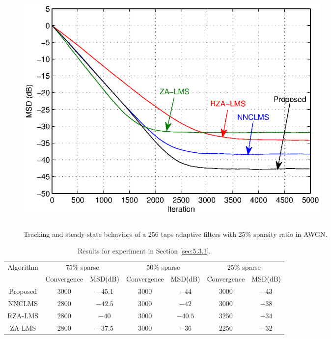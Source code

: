 \begin{figure}[!htb]
\begin{center}
\vspace{1cm}
\includegraphics[width=16cm, height=12cm]{Figures/Chapter5/fig8.eps}\\
\end{center}
\vspace{-1cm}
\caption{Tracking and steady-state behaviors of a 256 taps adaptive filters with 25\% sparsity ratio in AWGN.}
\label{fig10}
\vspace{1.5cm}
\end{figure}

 \begin{table}[!htb]
\centering
\caption{Results for experiment in Section \ref{sec:5.3.1}.}
\vspace{0.5cm}
\begin{tabular}{|c|c|c|c|c|c|c|}
 \hline
 \multirow{2}{*}{Algorithm} & \multicolumn{2}{c|}{75\% sparse} & \multicolumn{2}{c|}{50\% sparse} & \multicolumn{2}{c|}{25\% sparse} \\
 \cline{2-7}
  & Convergence  & MSD(dB) & Convergence & MSD(dB) &Convergence & MSD(dB)\\ \hline
  Proposed & 3000 & $-45.1$ & 3000 & $-44$ & 3000  & $-43$ \\ \hline
  NNCLMS  & 2800 & $-42.5$ & 3000 & $-42$ & 3000  & $-38$  \\ \hline
  RZA-LMS &2800  & $-40$ & 3000 & $-40.5$ & 3250 & $-34$   \\ \hline
  ZA-LMS & 2800  & $-37.5$ &3000 & $-36$ & 2250 & $-32$ \\ \hline
  \end{tabular}
  \label{table5}
  \end{table}


